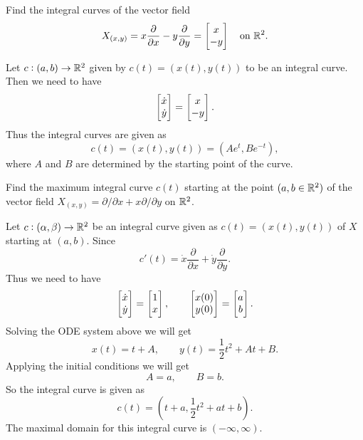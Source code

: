 \begin{problem}
	Find the integral curves of the vector field
	\[ X_{(x,y)} = x\frac{\partial }{\partial x} - y\frac{\partial }{\partial y} = \begin{bmatrix} x \\ -y \end{bmatrix} \quad \text{on } \mathbb{R}^2. \]
\end{problem}
\begin{solution}
	Let $ c:(a,b) \to \mathbb{R}^2 $ given by $ c(t) = (x(t),y(t)) $ to be an integral curve. Then we need to have
	\[ \begin{bmatrix} \dot{x} \\ \dot{y} \end{bmatrix} = \begin{bmatrix} x \\ -y \end{bmatrix}. \]
	Thus the integral curves are given as
	\[ c(t) = (x(t),y(t)) = (Ae^{t},Be^{-t}), \]
	where $ A $ and $ B $ are determined by the starting point of the curve. 
\end{solution}

\begin{problem}
	Find the maximum integral curve $ c(t) $ starting at the point $ (a,b \in \mathbb{R}^2) $ of the vector field $ X_{(x,y)} = \partial/\partial x + x \partial/\partial y $ on $ \mathbb{R}^2 $.
\end{problem}
\begin{solution}
	Let $ c:(\alpha,\beta) \to \mathbb{R}^2 $ be an integral curve given as $ c(t) = (x(t),y(t)) $ of $ X $ starting at $ (a,b) $. Since
	\[ c'(t) = \dot{x}\frac{\partial }{\partial x} + \dot{y} \frac{\partial }{\partial y}. \]
	Thus we need to have
	\[ \begin{bmatrix} \dot{x} \\ \dot{y} \end{bmatrix} = \begin{bmatrix} 1 \\ x \end{bmatrix},\qquad \begin{bmatrix} x(0) \\ y(0) \end{bmatrix} = \begin{bmatrix} a \\ b \end{bmatrix}. \]
	Solving the ODE system above we will get
	\[ x(t) = t + A, \qquad y(t) = \frac12 t^2 + A t + B. \]
	Applying the initial conditions we will get
	\[ A = a,\qquad B = b. \]
	So the integral curve is given as
	\[ c(t) = (t+a, \frac12 t^2 + at + b). \]
	The maximal domain for this integral curve is $ (-\infty,\infty) $.
\end{solution}


